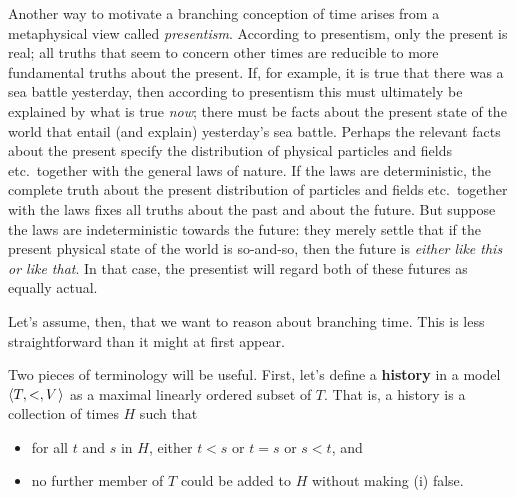 Another way to motivate a branching conception of time arises from a
metaphysical view called \emph{presentism}. According to presentism, only the
present is real; all truths that seem to concern other times are reducible to
more fundamental truths about the present. If, for example, it is true that
there was a sea battle yesterday, then according to presentism this must
ultimately be explained by what is true \emph{now}; there must be facts about
the present state of the world that entail (and explain) yesterday's sea battle.
Perhaps the relevant facts about the present specify the distribution
of physical particles and fields etc.\ together with the general laws of nature.
If the laws are deterministic, the complete truth about the
present distribution of particles and fields etc.\ together with the laws fixes
all truths about the past and about the future. But suppose the laws are
indeterministic towards the future: they merely settle that if the present
physical state of the world is so-and-so, then the future is \emph{either like
  this or like that}. In that case, the presentist will regard both of these
futures as equally actual.

Let's assume, then, that we want to reason about branching time. This is less
straightforward than it might at first appear.


Two pieces of terminology will be useful. First, let's define a \textbf{history}
in a model $\t{T,<,V}$ as a maximal linearly ordered subset of $T$. That is, a
history is a collection of times $H$ such that
\begin{itemize}[leftmargin=10mm]
  \itemsep0mm
\item[(i)] for all $t$ and $s$ in $H$, either $t<s$ or $t=s$ or $s<t$, and
\item[(ii)] no further member of $T$ could be added to $H$ without
  making (i) false.
\end{itemize}
%
\noindent
\begin{figure}
  \vspace{-8mm}
  \quad
  \vspace{-10mm}
\end{figure}

